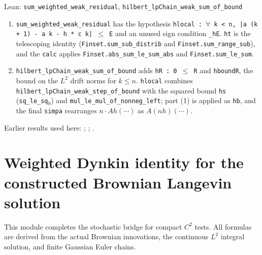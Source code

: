 \documentclass[11pt,a4paper]{report}
\begin{document}
\begin{leanbox}{Lean: \texttt{sum\_\allowbreak{}weighted\_\allowbreak{}weak\_\allowbreak{}residual}, \texttt{hilbert\_\allowbreak{}lpChain\_\allowbreak{}weak\_\allowbreak{}sum\_\allowbreak{}of\_\allowbreak{}bound}}
\begin{enumerate}
\item \texttt{sum\_\allowbreak{}weighted\_\allowbreak{}weak\_\allowbreak{}residual} has the hypothesis \texttt{hlocal : \ensuremath{\forall} k < n, |a (k + 1) -\allowbreak{} a k -\allowbreak{} h * c k| \ensuremath{\le} E} and an unused sign condition \texttt{\_\allowbreak{}h\allowbreak{}E}. \texttt{ht} is the telescoping identity (\texttt{Finset.\allowbreak{}sum\_\allowbreak{}sub\_\allowbreak{}distrib} and \texttt{Finset.\allowbreak{}sum\_\allowbreak{}range\_\allowbreak{}sub}), and the \texttt{calc} applies \texttt{Finset.\allowbreak{}abs\_\allowbreak{}sum\_\allowbreak{}le\_\allowbreak{}sum\_\allowbreak{}abs} and \texttt{Finset.\allowbreak{}sum\_\allowbreak{}le\_\allowbreak{}sum}.

\item \texttt{hilbert\_\allowbreak{}lp\allowbreak{}Chain\_\allowbreak{}weak\_\allowbreak{}sum\_\allowbreak{}of\_\allowbreak{}bound} adds \texttt{h\allowbreak{}R : 0 \ensuremath{\le} R} and \texttt{hbound\allowbreak{}R}, the bound on the \(L^2\) drift norms for \(k\le n\). \texttt{hlocal} combines \texttt{hilbert\_\allowbreak{}lp\allowbreak{}Chain\_\allowbreak{}weak\_\allowbreak{}step\_\allowbreak{}of\_\allowbreak{}bound} with the squared bound \texttt{hs} (\texttt{sq\_\allowbreak{}le\_\allowbreak{}sq\ensuremath{{}_{0}}}) and \texttt{mul\_\allowbreak{}le\_\allowbreak{}mul\_\allowbreak{}of\_\allowbreak{}nonneg\_\allowbreak{}left}; part (1) is applied as \texttt{hb}, and the final \texttt{simpa} rearranges \(n\cdot Ah(\cdots)\) as \(A(nh)(\cdots)\).

\end{enumerate}
\end{leanbox}


Earlier results used here: \cite[Section~3.13.2]{LangevinLean2026ULASC}; \cite[Section~3.19.1]{LangevinLean2026ULASC}; \cite[Section~3.46.2]{LangevinLean2026ULASC}.
\section{\texorpdfstring{Weighted Dynkin identity for the constructed Brownian Langevin solution}{Weighted Dynkin identity for the constructed Brownian Langevin solution}}
\label{proof-module-AverageLMC-LaplacianBrownianDynkin-lean}


This module completes the stochastic bridge for compact \(C^{2}\) tests. All formulas are derived from the actual Brownian innovations, the continuous \(L^{2}\) integral solution, and finite Gaussian Euler chains.
\end{document}

